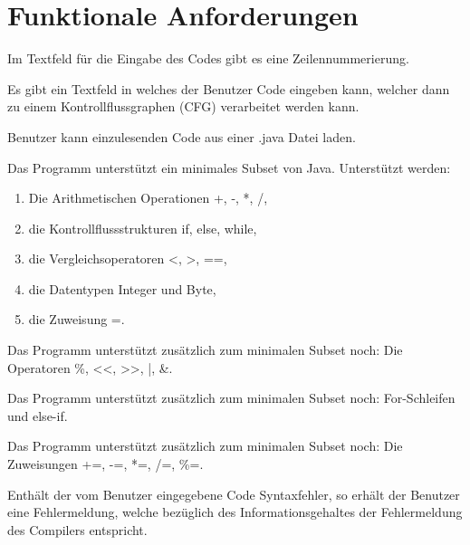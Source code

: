 
\section{Funktionale Anforderungen}

Im Textfeld für die Eingabe des Codes gibt es eine Zeilennummerierung.

Es gibt ein Textfeld in welches der Benutzer Code eingeben kann, welcher dann zu einem Kontrollflussgraphen (CFG) verarbeitet werden kann.

Benutzer kann einzulesenden Code aus einer .java Datei laden.

Das Programm unterstützt ein minimales Subset von Java.
Unterstützt werden:
\begin{enumerate}[label=(\alph*)]
\item Die Arithmetischen Operationen +, -, *, /,
\item die Kontrollflussstrukturen if, else, while,
\item die Vergleichsoperatoren <, >, ==,
\item die Datentypen Integer und Byte,
\item die Zuweisung =.
\end{enumerate}

Das Programm unterstützt zusätzlich zum minimalen Subset noch:
Die Operatoren \%, <<, >>, |, \&.

Das Programm unterstützt zusätzlich zum minimalen Subset noch:
For-Schleifen und else-if.

Das Programm unterstützt zusätzlich zum minimalen Subset noch:
Die Zuweisungen +=, -=, *=, /=, \%=.

Enthält der vom Benutzer eingegebene Code Syntaxfehler, so erhält der Benutzer eine Fehlermeldung, welche bezüglich des Informationsgehaltes der Fehlermeldung des Compilers entspricht.

